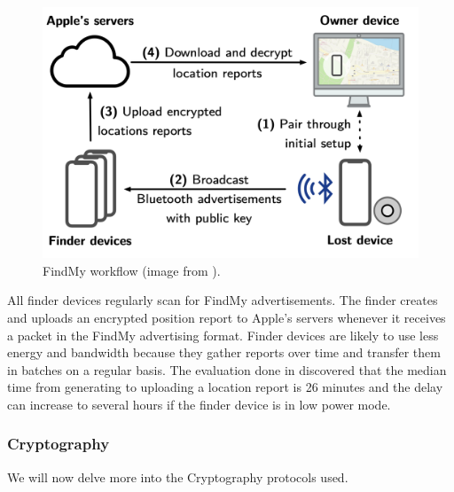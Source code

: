 \documentclass[english]{article}
\begin{document}
\begin{figure}[]
	\centering
	\includegraphics[width=.5\textwidth]{images/process.png}
	\caption{FindMy workflow (image from \cite{whocanfind}).}
	\label{process}
\end{figure}
All finder devices regularly scan for FindMy advertisements.
The finder creates and uploads an encrypted position report to Apple's servers whenever it receives a packet in the FindMy advertising format. Finder devices are likely to use less energy and bandwidth because they gather reports over time and transfer them in batches on a regular basis. The evaluation done in \cite{whocanfind} discovered that the median time from generating to uploading a location report is 26 minutes and the delay can increase to several hours if the finder device is in low power mode.

\subsubsection{Cryptography}
We will now delve more into the Cryptography protocols used. 
\end{document}
